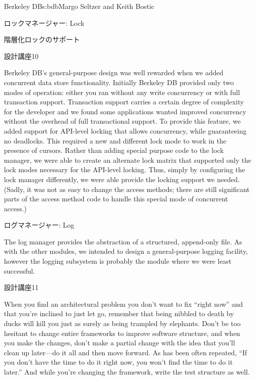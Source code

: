 \begin{aosachapter}{Berkeley DB}{s:bdb}{Margo Seltzer and Keith Bostic}
\begin{aosasect1}{ロックマネージャー: Lock}
\begin{aosasect2}{階層化ロックのサポート}
\begin{aosabox}{設計講座10}

Berkeley DB's general-purpose design was well rewarded when we added
concurrent data store functionality. Initially Berkeley
DB provided only two modes of operation: either you ran without any
write concurrency or with full transaction support. Transaction
support carries a certain degree of complexity for the developer and
we found some applications wanted improved concurrency without the
overhead of full transactional support. To provide this feature, we
added support for API-level locking that allows concurrency, while
guaranteeing no deadlocks.  This required a new and different lock
mode to work in the presence of cursors. Rather than adding special
purpose code to the lock manager, we were able to create an alternate
lock matrix that supported only the lock modes necessary for the
API-level locking.  Thus, simply by configuring the lock manager
differently, we were able provide the locking support we
needed. (Sadly, it was not as easy to change the access methods; there
are still significant parts of the access method code to handle this
special mode of concurrent access.)

\end{aosabox}

\end{aosasect2}

\end{aosasect1}

\begin{aosasect1}{ログマネージャー: Log}
\label{sec.bdb.log}

The log manager provides the abstraction of a structured, append-only
file. As with the other modules, we intended to design a
general-purpose logging facility, however the logging subsystem is
probably the module where we were least successful. 

\begin{aosabox}{設計講座11}

When you find an architectural problem you don't want to fix ``right
now'' and that you're inclined to just let go, remember that being
nibbled to death by ducks will kill you just as surely as being
trampled by elephants. Don't be too hesitant to change entire
frameworks to improve software structure, and when you make the
changes, don't make a partial change with the idea that you'll clean
up later---do it all and then move forward. As has been often
repeated, ``If you don't have the time to do it right now, you won't
find the time to do it later.'' And while you're changing the
framework, write the test structure as well.


\end{aosabox}
\end{aosasect1}
\end{aosachapter}
